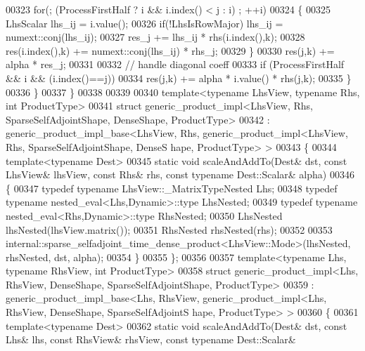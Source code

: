 \begin{DoxyCode}
00323       \textcolor{keywordflow}{for}(; (ProcessFirstHalf ? i && i.index() < j : i) ; ++i)
00324       \{
00325         LhsScalar lhs\_ij = i.value();
00326         \textcolor{keywordflow}{if}(!LhsIsRowMajor) lhs\_ij = numext::conj(lhs\_ij);
00327         res\_j += lhs\_ij * rhs(i.index(),k);
00328         res(i.index(),k) += numext::conj(lhs\_ij) * rhs\_j;
00329       \}
00330       res(j,k) += alpha * res\_j;
00331 
00332       \textcolor{comment}{// handle diagonal coeff}
00333       \textcolor{keywordflow}{if} (ProcessFirstHalf && i && (i.index()==j))
00334         res(j,k) += alpha * i.value() * rhs(j,k);
00335     \}
00336   \}
00337 \}
00338 
00339 
00340 \textcolor{keyword}{template}<\textcolor{keyword}{typename} LhsView, \textcolor{keyword}{typename} Rhs, \textcolor{keywordtype}{int} ProductType>
00341 \textcolor{keyword}{struct }generic\_product\_impl<LhsView, Rhs, SparseSelfAdjointShape, DenseShape, ProductType>
00342 : generic\_product\_impl\_base<LhsView, Rhs, generic\_product\_impl<LhsView, Rhs, SparseSelfAdjointShape, DenseS
      hape, ProductType> >
00343 \{
00344   \textcolor{keyword}{template}<\textcolor{keyword}{typename} Dest>
00345   \textcolor{keyword}{static} \textcolor{keywordtype}{void} scaleAndAddTo(Dest& dst, \textcolor{keyword}{const} LhsView& lhsView, \textcolor{keyword}{const} Rhs& rhs, \textcolor{keyword}{const} \textcolor{keyword}{typename} Dest::Scalar&
       alpha)
00346   \{
00347     \textcolor{keyword}{typedef} \textcolor{keyword}{typename} LhsView::\_MatrixTypeNested Lhs;
00348     \textcolor{keyword}{typedef} \textcolor{keyword}{typename} nested\_eval<Lhs,Dynamic>::type LhsNested;
00349     \textcolor{keyword}{typedef} \textcolor{keyword}{typename} nested\_eval<Rhs,Dynamic>::type RhsNested;
00350     LhsNested lhsNested(lhsView.matrix());
00351     RhsNested rhsNested(rhs);
00352     
00353     internal::sparse\_selfadjoint\_time\_dense\_product<LhsView::Mode>(lhsNested, rhsNested, dst, alpha);
00354   \}
00355 \};
00356 
00357 \textcolor{keyword}{template}<\textcolor{keyword}{typename} Lhs, \textcolor{keyword}{typename} RhsView, \textcolor{keywordtype}{int} ProductType>
00358 \textcolor{keyword}{struct }generic\_product\_impl<Lhs, RhsView, DenseShape, SparseSelfAdjointShape, ProductType>
00359 : generic\_product\_impl\_base<Lhs, RhsView, generic\_product\_impl<Lhs, RhsView, DenseShape, SparseSelfAdjointS
      hape, ProductType> >
00360 \{
00361   \textcolor{keyword}{template}<\textcolor{keyword}{typename} Dest>
00362   \textcolor{keyword}{static} \textcolor{keywordtype}{void} scaleAndAddTo(Dest& dst, \textcolor{keyword}{const} Lhs& lhs, \textcolor{keyword}{const} RhsView& rhsView, \textcolor{keyword}{const} \textcolor{keyword}{typename} Dest::Scalar&

\end{DoxyCode}
